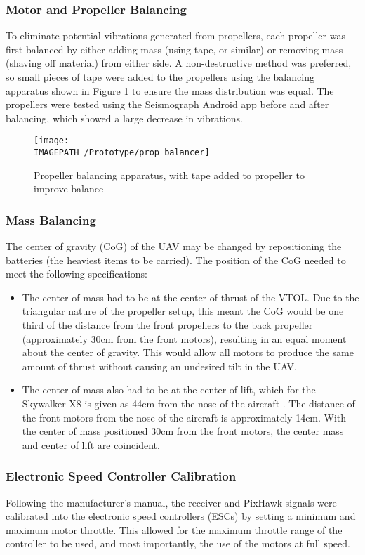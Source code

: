 \subsubsection*{Motor and Propeller Balancing}
To eliminate potential vibrations generated from propellers, each propeller was first balanced by either adding mass (using tape, or similar) or removing mass (shaving off material) from either side. A non-destructive method was preferred, so small pieces of tape were added to the propellers using the balancing apparatus shown in Figure \ref{fig:propbalancing} to ensure the mass distribution was equal. The propellers were tested using the Seismograph Android app before and after balancing, which showed a large decrease in vibrations.
\begin{figure}[!ht]
	\centering
	\texttt{[image: \\IMAGEPATH /Prototype/prop\_balancer]}
	\caption{Propeller balancing apparatus, with tape added to propeller to improve balance}
	\label{fig:propbalancing}
\end{figure}

\subsubsection*{Mass Balancing}
The center of gravity (CoG) of the UAV may be changed by repositioning the batteries (the heaviest items to be carried). The position of the CoG needed to meet the following specifications:

\begin{itemize}
	\item The center of mass had to be at the center of thrust of the VTOL. Due to the triangular nature of the propeller setup, this meant the CoG would be one third of the distance from the front propellers to the back propeller (approximately 30cm from the front motors), resulting in an equal moment about the center of gravity. This would allow all motors to produce the same amount of thrust without causing an undesired tilt in the UAV.
	\item The center of mass also had to be at the center of lift, which for the Skywalker X8 is given as 44cm from the nose of the aircraft \cite{ref:x8kit}. The distance of the front motors from the nose of the aircraft is approximately 14cm. With the center of mass positioned 30cm from the front motors, the center mass and center of lift are coincident.
\end{itemize}
	
\subsubsection*{Electronic Speed Controller Calibration}
Following the manufacturer's manual, the receiver and PixHawk signals were calibrated into the electronic speed controllers (ESCs) by setting a minimum and maximum motor throttle. This allowed for the maximum throttle range of the controller to be used, and most importantly, the use of the motors at full speed.

